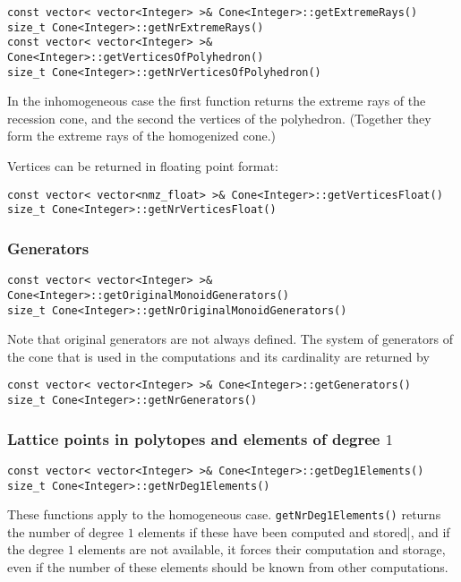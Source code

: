 \documentclass[12pt,a4paper]{scrartcl}
\theoremstyle{definition}
\begin{document}
\begin{small}
\begin{Verbatim}
const vector< vector<Integer> >& Cone<Integer>::getExtremeRays()
size_t Cone<Integer>::getNrExtremeRays()
const vector< vector<Integer> >& Cone<Integer>::getVerticesOfPolyhedron()
size_t Cone<Integer>::getNrVerticesOfPolyhedron()
\end{Verbatim}

In the inhomogeneous case the first function returns the extreme rays of the recession cone, and the second the vertices of the polyhedron. (Together they form the extreme rays of the homogenized cone.)

Vertices can be returned in floating point format:
\begin{Verbatim}
const vector< vector<nmz_float> >& Cone<Integer>::getVerticesFloat()
size_t Cone<Integer>::getNrVerticesFloat()
\end{Verbatim}

\subsubsection{Generators}

\begin{Verbatim}
const vector< vector<Integer> >& Cone<Integer>::getOriginalMonoidGenerators()
size_t Cone<Integer>::getNrOriginalMonoidGenerators()
\end{Verbatim}
Note that original generators are not always defined. The system of generators of the cone that is used in the computations and its cardinality are returned by
\begin{Verbatim}
const vector< vector<Integer> >& Cone<Integer>::getGenerators()
size_t Cone<Integer>::getNrGenerators()
\end{Verbatim}

\subsubsection{Lattice points in polytopes and elements of degree $1$}

\begin{Verbatim}
const vector< vector<Integer> >& Cone<Integer>::getDeg1Elements()
size_t Cone<Integer>::getNrDeg1Elements()
\end{Verbatim}
These functions apply to the homogeneous case. \verb|getNrDeg1Elements()| returns the number of degree $1$ elements if these have been computed and stored|, and if the degree $1$ elements are not available, it forces their computation and storage, even if the number of these elements should be known from other computations.


\end{small}
\end{document}

